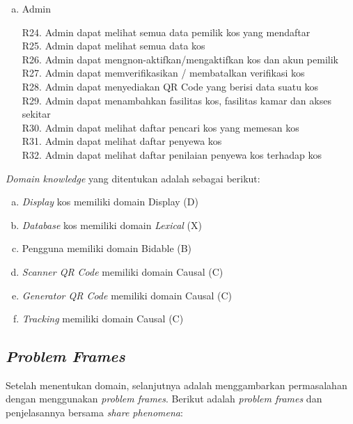 \begin{enumerate} [a.]
		\item Admin
		
		R24. Admin dapat melihat semua data pemilik kos yang mendaftar \\
		R25. Admin dapat melihat semua data kos \\
		R26. Admin dapat mengnon-aktifkan/mengaktifkan kos dan akun pemilik \\
		R27. Admin dapat memverifikasikan / membatalkan verifikasi kos \\
		R28. Admin dapat menyediakan QR Code yang berisi data suatu kos \\
		R29. Admin dapat menambahkan fasilitas kos, fasilitas kamar dan akses sekitar \\
		R30. Admin dapat melihat daftar pencari kos yang memesan kos \\
		R31. Admin dapat melihat daftar penyewa kos \\ 
		R32. Admin dapat melihat daftar penilaian penyewa kos terhadap kos \\
		
	\end{enumerate}
		\textit{Domain knowledge} yang ditentukan adalah sebagai berikut:
		
		\begin{enumerate}[a.]
			\item \textit{Display} kos memiliki domain Display (D)
			\item \textit{Database} kos memiliki domain \textit{Lexical} (X)
			\item Pengguna memiliki domain Bidable (B)
			\item \textit{Scanner QR Code} memiliki domain Causal (C)
			\item \textit{Generator QR Code} memiliki domain Causal (C)
			\item \textit{Tracking} memiliki domain Causal (C)
		\end{enumerate}
		
		\subsection{\textit{Problem Frames}}
		Setelah menentukan domain, selanjutnya adalah menggambarkan permasalahan dengan menggunakan \textit{problem frames}. Berikut adalah \textit{problem frames} dan penjelasannya bersama \textit{share phenomena}:
		
